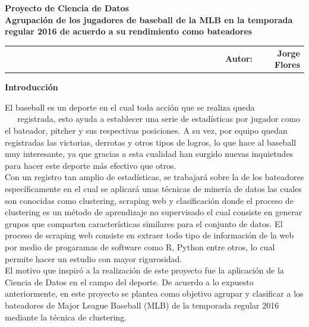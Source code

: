 \documentclass[11pt,letterpaper]{report}
\begin{document}
	
	\begin{center}
		\textbf{\large Proyecto de Ciencia de Datos\\
		 Agrupaci\'on de los jugadores de baseball de la MLB en la temporada regular 2016 de acuerdo a su rendimiento como bateadores}
	\end{center}  
	
	\begin{table}[h]
		\begin{tabular}{l l c r r}
			\textbf{} &\ \ \ \ \ \ \ \ \ \ \ \ \ \ \ \ \ \ \ \ \ \ \ \ \ \ \ \ \ \ \ \ \ \ \ \ \ \ \ \ \ \ \ \ \ \  \textbf{ }  & & \textbf{\large Autor:} & \textbf{\large Jorge Flores } \\ 
		\end{tabular}
	\end{table} 
	
	\begin{center}
		\textbf{\large Introducci\'on}
	\end{center}
	
	
	El baseball es un deporte en el cual toda acci\'on que se realiza queda \ \ \ registrada, esto ayuda a establecer una serie de estad\'isticas por jugador como el bateador, pitcher y sus respectivas posiciones. A su vez, por equipo quedan registradas las victorias, derrotas y otros tipos de logros, lo que hace al baseball muy interesante, ya que gracias a esta cualidad han surgido nuevas inquietudes para hacer este deporte m\'as efectivo que otros. \\ 
	
	Con un registro tan amplio de estad\'isticas, se trabajar\'a sobre la de los bateadores espec\'ificamente en el cual se aplicar\'a unas t\'ecnicas de miner\'ia de datos las cuales son conocidas como clustering, scraping web y clasificaci\'on donde el proceso de clustering es un m\'etodo de aprendizaje no supervisado el cual consiste en generar grupos que comparten caracter\'isticas similares para el conjunto de datos. El proceso de scraping web consiste en extraer todo tipo de informaci\'on de la web por medio de progaramas de software como R, Python entre otros, lo cual permite hacer un estudio con mayor rigurosidad. \\ 
	
	El motivo que inspir\'o a la realizaci\'on de este proyecto fue la aplicaci\'on de la Ciencia de Datos en el campo del deporte.
	De acuerdo a lo expuesto anteriormente, en este proyecto se plantea como objetivo agrupar y clasificar a los bateadores de Major League Baseball (MLB) de la temporada regular 2016 mediante la técnica de clustering. \\ \\ 
	
\end{document}
